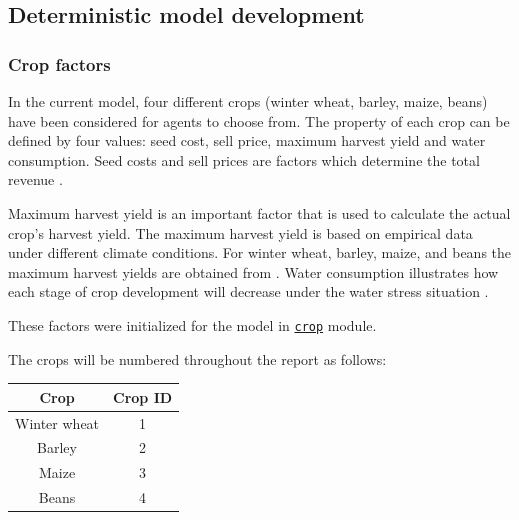 \documentclass[a4paper,12pt]{article} %
\begin{document}


\subsection{Deterministic model development}

\subsubsection{Crop factors}
In the current model, four different crops (winter wheat, barley, maize, beans) have been considered for agents to choose from. 
The property of each crop can be defined by four values: seed cost, sell price, maximum harvest yield and water consumption. Seed costs and sell prices are factors which determine the total revenue \cite{Jose}. 


Maximum harvest yield is an important factor that is used to calculate the actual crop’s harvest yield.  The maximum harvest yield is based on empirical data under different climate conditions. For winter wheat, barley, maize, and beans the maximum harvest yields are obtained from \cite{w9030157}. Water consumption illustrates how each stage of crop development will decrease under the water stress situation \cite{VAUX198361}.

These factors were initialized for the model in \href{https://n.ethz.ch/~cgolling/gess/html/code/crops.html}{\texttt{crop}} module.

The crops will be numbered throughout the report as follows:
\begin{center}
\begin{tabular}{ ||c|c|| } 
\hline
Crop & Crop ID  \\
\hline
Winter wheat & 1\\
Barley & 2 \\
Maize & 3 \\
Beans & 4 \\
\hline
\end{tabular}
\end{center}
\end{document}
